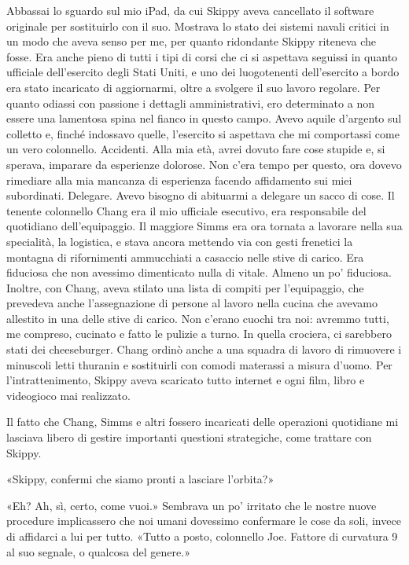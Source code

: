 Abbassai lo sguardo sul mio iPad, da cui Skippy aveva cancellato il
software originale per sostituirlo con il suo. Mostrava lo stato dei
sistemi navali critici in un modo che aveva senso per me, per quanto
ridondante Skippy riteneva che fosse. Era anche pieno di tutti i tipi di
corsi che ci si aspettava seguissi in quanto ufficiale dell'esercito
degli Stati Uniti, e uno dei luogotenenti dell'esercito a bordo era
stato incaricato di aggiornarmi, oltre a svolgere il suo lavoro
regolare. Per quanto odiassi con passione i dettagli amministrativi, ero
determinato a non essere una lamentosa spina nel fianco in questo campo.
Avevo aquile d'argento sul colletto e, finché indossavo quelle,
l'esercito si aspettava che mi comportassi come un vero colonnello.
Accidenti. Alla mia età, avrei dovuto fare cose stupide e, si sperava,
imparare da esperienze dolorose. Non c'era tempo per questo, ora dovevo
rimediare alla mia mancanza di esperienza facendo affidamento sui miei
subordinati. Delegare. Avevo bisogno di abituarmi a delegare un sacco di
cose. Il tenente colonnello Chang era il mio ufficiale esecutivo, era
responsabile del quotidiano dell'equipaggio. Il maggiore Simms era ora
tornata a lavorare nella sua specialità, la logistica, e stava ancora
mettendo via con gesti frenetici la montagna di rifornimenti ammucchiati
a casaccio nelle stive di carico. Era fiduciosa che non avessimo
dimenticato nulla di vitale. Almeno un po' fiduciosa. Inoltre, con
Chang, aveva stilato una lista di compiti per l'equipaggio, che
prevedeva anche l'assegnazione di persone al lavoro nella cucina che
avevamo allestito in una delle stive di carico. Non c'erano cuochi tra
noi: avremmo tutti, me compreso, cucinato e fatto le pulizie a turno. In
quella crociera, ci sarebbero stati dei cheeseburger. Chang ordinò anche
a una squadra di lavoro di rimuovere i minuscoli letti thuranin e
sostituirli con comodi materassi a misura d'uomo. Per l'intrattenimento,
Skippy aveva scaricato tutto internet e ogni film, libro e videogioco
mai realizzato.

Il fatto che Chang, Simms e altri fossero incaricati delle operazioni
quotidiane mi lasciava libero di gestire importanti questioni
strategiche, come trattare con Skippy.

«Skippy, confermi che siamo pronti a lasciare l'orbita?»

«Eh? Ah, sì, certo, come vuoi.» Sembrava un po' irritato che le nostre
nuove procedure implicassero che noi umani dovessimo confermare le cose
da soli, invece di affidarci a lui per tutto. «Tutto a posto, colonnello
Joe. Fattore di curvatura 9 al suo segnale, o qualcosa del genere.»

